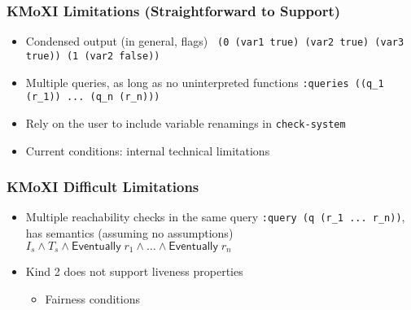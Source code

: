 \documentclass[11pt,xcolor={dvipsnames},hyperref={pdftex,pdfpagemode=UseNone,hidelinks,pdfdisplaydoctitle=true},usepdftitle=false]{beamer}
\newcommand{\code}[1]{{\footnotesize\texttt{#1}}}
\begin{document}
\begin{frame}
    \frametitle{KMoXI Limitations (Straightforward to Support)}
    \begin{itemize}
        \item Condensed output (in general, flags) \newline 
        {\footnotesize \texttt {
                (0 (var1 true) (var2 true) (var3 true)) \newline
                (1 (var2 false))}} \pause 
        \item Multiple queries, as long as no uninterpreted functions \newline 
        {\footnotesize \texttt {:queries ((q\_1 (r\_1)) ... (q\_n (r\_n)))}}
        \item Rely on the user to include variable renamings in \code{check-system}
        \item Current conditions: internal technical limitations
    \end{itemize}
\end{frame}

\begin{frame}
    \frametitle{KMoXI Difficult Limitations}
    \begin{itemize}


        \item Multiple reachability checks in the same query \newline \pause
        \code{:query (q (r\_1 ... r\_n))}, \newline has semantics (assuming no assumptions) \newline 
        $I_s \land T_s \land \mathsf{Eventually}\; r_1 \land \dots \land \mathsf{Eventually}\; r_n$ \pause
        \item Kind 2 does not support liveness properties \pause
        \begin{itemize}
        \item Fairness conditions \pause
        \end{itemize}
    \end{itemize}
\end{frame}
\end{document}
